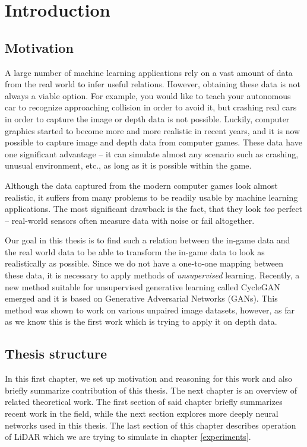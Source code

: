 \chapter{Introduction}

\section{Motivation}

A large number of machine learning applications rely on a vast amount of data from the real world to infer useful relations. However, obtaining these data is not always a viable option. For example, you would like to teach your autonomous car to recognize approaching collision in order to avoid it, but crashing real cars in order to capture the image or depth data is not possible. Luckily, computer graphics started to become more and more realistic in recent years, and it is now possible to capture image and depth data from computer games. These data have one significant advantage -- it can simulate almost any scenario such as crashing, unusual environment, etc., as long as it is possible within the game.

Although the data captured from the modern computer games look almost realistic, it suffers from many problems to be readily usable by machine learning applications. The most significant drawback is the fact, that they look {\em too} perfect -- real-world sensors often measure data with noise or fail altogether.

Our goal in this thesis is to find such a relation between the in-game data and the real world data to be able to transform the in-game data to look as realistically as possible. Since we do not have a one-to-one mapping between these data, it is necessary to apply methods of {\em unsupervised} learning. Recently, a new method suitable for unsupervised generative learning called CycleGAN emerged and it is based on Generative Adversarial Networks (GANs). This method was shown to work on various unpaired image datasets, however, as far as we know this is the first work which is trying to apply it on depth data.

\section{Thesis structure}
In this first chapter, we set up motivation and reasoning for this work and also briefly summarize contribution of this thesis. The next chapter is an overview of related theoretical work. The first section of said chapter briefly summarizes recent work in the field, while the next section explores more deeply neural networks used in this thesis. The last section of this chapter describes operation of LiDAR which we are trying to simulate in chapter \ref{experiments}.


